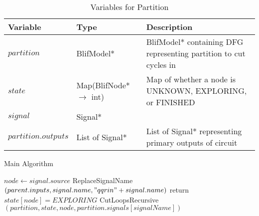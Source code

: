 \documentclass[12pt,draft,oneside]{article} %
\begin{document}
\begin{table}
    \begin{center}
        \begin{tabular}{lll}
        \toprule
        Variable & Type & Description\\
        \midrule
        $partition$ & BlifModel* & BlifModel* containing DFG representing partition to cut cycles in\\
        $state$ & Map(BlifNode* $\to$ int) & Map of whether a node is UNKNOWN, EXPLORING, or FINISHED\\
        $signal$ & Signal* & \\
        $partition.outputs$ & List of Signal* & List of Signal* representing primary outputs of circuit\\
        \bottomrule
        \end{tabular}
        \caption{Variables for Partition}
        \label{varPart}
    \end{center}
\end{table}
\begin{algorithm}
   \caption{Main Algorithm}\label{main}
   \begin{algorithmic}[1]
            \State $node \gets signal.source$
               \State ReplaceSignalName$(parent.inputs, signal.name, "qqrin"+signal.name)$
             
               \State return
            \Else{}
               \State $state[node] = EXPLORING$
                  \State CutLoopsRecursive$(partition, state, node, partition.signals[signalName])$
               \EndFor
            \EndIf
         \EndProcedure
   \end{algorithmic}
\end{algorithm}
\end{document}
